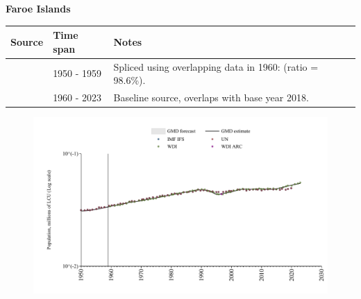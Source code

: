 \documentclass[12pt,a4paper,landscape]{article}
\begin{document}
\begin{adjustbox}{max totalsize={\paperwidth}{\paperheight},center}
\begin{minipage}[t][\textheight][t]{\textwidth}
\vspace*{0.5cm}
{}
\begin{center}
{\Large\bfseries Faroe Islands}
\end{center}
\vspace{0.5cm}
\begin{table}[H]
\centering
\small
\begin{tabular}{|l|l|l|}
\hline
\textbf{Source} & \textbf{Time span} & \textbf{Notes} \\
\hline
\rowcolor{white}\cite{IMF_IFS}& 1950 - 1959 &Spliced using overlapping data in 1960: (ratio = 98.6\%).\\
\rowcolor{lightgray}\cite{WDI}& 1960 - 2023 &Baseline source, overlaps with base year 2018.\\
\hline
\end{tabular}
\end{table}
\begin{figure}[H]
\centering
\includegraphics[width=\textwidth,height=0.6\textheight,keepaspectratio]{graphs/FRO_pop.pdf}
\end{figure}
\end{minipage}
\end{adjustbox}
\end{document}
